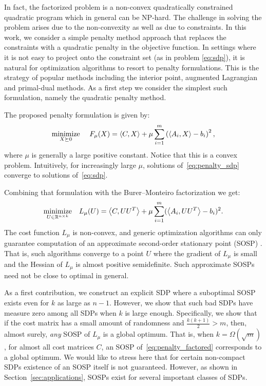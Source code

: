 In fact, the factorized problem is a non-convex quadratically constrained quadratic program which in general can be NP-hard. The challenge in solving the problem arises due to the non-convexity as well as due to constraints. In this work, we consider a simple penalty method approach that replaces the constraints with a quadratic penalty in the objective function. In settings where it is not easy to project onto the constraint set (as in problem \eqref{eq:sdp}), it is natural for optimization algorithms to resort to penalty formulations. This is the strategy of popular methods including the interior point, augmented Lagrangian and primal-dual methods. As a first step we consider the simplest such formulation, namely the quadratic penalty method.


The proposed penalty formulation is given by: 
\begin{align}
	\underset{X \succeq 0}{\operatorname*{\mathrm{minimize}}} ~\quad F_{\mu}(X) =  \left\langle C, X \right\rangle + \mu \sum_{i=1}^m \left(\left\langle A_i, X \right\rangle -b_i\right)^2,
	\label{eq:penalty_sdp}
\end{align}
where $\mu$ is generally a large positive constant. Notice that this is a convex problem. Intuitively, for increasingly large $\mu$, solutions of~\eqref{eq:penalty_sdp} converge to solutions of~\eqref{eq:sdp}.

Combining that formulation with the Burer--Monteiro factorization we get:
\begin{align}
	\underset{U \in \mathbb{R}^{n\times k}}{\operatorname*{\mathrm{minimize}}} \quad  L_{\mu}(U) =  \left\langle C, UU^T \right\rangle + \mu \sum_{i=1}^m (\left\langle A_i, UU^T \right\rangle -b_i)^2.
	\label{eq:penalty_factored}
\end{align}
The cost function $L_{\mu}$ is non-convex, and generic optimization algorithms can only guarantee computation of an approximate second-order stationary point (SOSP) \citep{cartis2012complexity,ge2015escaping}. That is, such algorithms converge to a point $U$ where the gradient of $L_\mu$ is small and the Hessian of $L_\mu$ is almost positive semidefinite. Such approximate SOSPs need not be close to optimal in general.

As a first contribution, we construct an explicit SDP where a suboptimal SOSP exists even for $k$ as large as $n-1$. However, we show that such bad SDPs have measure zero among all SDPs when $k$ is large enough. Specifically, we show that if the cost matrix has a small amount of randomness and $\frac{k(k+1)}{2} > m$, then, almost surely, {\em any} SOSP of $L_\mu$ is a global optimum. %
That is, when $k = \Omega(\sqrt{m})$, for almost all cost matrices $C$, an SOSP of~\eqref{eq:penalty_factored} corresponds to a global optimum. We would like to stress here that for certain non-compact SDPs existence of an SOSP itself is not guaranteed. However, as shown in Section~\ref{sec:applications}, SOSPs exist for several important classes of SDPs. 

